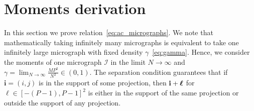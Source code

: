 \documentclass[english,11pt]{article}
\newcommand{\1}{\mathbf{1}}
\newcommand{\II}{\mathcal{I}}
\newcommand{\mb}{\mathbf}
\newcommand*\Bell{\ensuremath{\boldsymbol\ell}}
\numberwithin{equation}{section}
\theoremstyle{plain}
\theoremstyle{definition}
\theoremstyle{remark}
\theoremstyle{plain}
\theoremstyle{remark}
\theoremstyle{plain}
\theoremstyle{plain}
\begin{document}
\section{Moments derivation} \label{sec:moment_derivation}
In this section we prove relation~\eqref{eq:ac_micrographs}. We note that mathematically taking infinitely many micrographs is equivalent to take one infinitely large micrograph with fixed density $\gamma$~\eqref{eq:gamma}. Hence, we consider the moments of one micrograph $\II$ in the limit $N\to\infty$ and  $\gamma = \lim_{N\to\infty}\frac{MP^2}{N^2}\in(0,1)$. %
The separation condition guarantees that if $\mb i=(i,j)$ is in the support of some projection, then $\mb i + \mb \Bell$ for $\Bell\in[-(P-1),P-1]^2$ is either in the support of the same projection or outside the support of any projection. %
\end{document}
